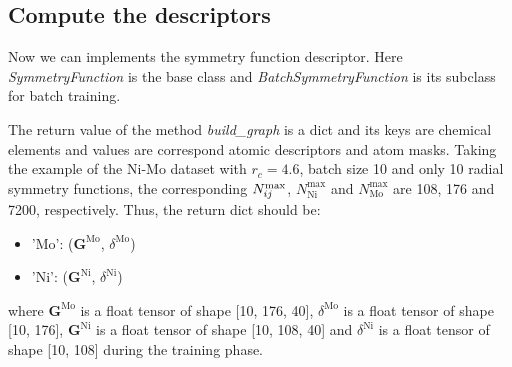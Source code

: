 \documentclass[final,1p,times]{elsarticle}
\begin{document}
% 
%
\subsection{Compute the descriptors}

Now we can implements the symmetry function descriptor. Here 
\textit{SymmetryFunction} is the base class and \textit{BatchSymmetryFunction} 
is its subclass for batch training.

The return value of the method \textit{build\_graph} is a dict and its keys are
chemical elements and values are correspond atomic descriptors and atom masks. 
Taking the example of the Ni-Mo dataset with $r_c = 4.6$, batch size 10 and only
10 radial symmetry functions, the corresponding $N_{ij}^{\mathrm{max}}$, 
$N_{\mathrm{Ni}}^{\mathrm{max}}$ and $N_{\mathrm{Mo}}^{\mathrm{max}}$ are 108, 
176 and 7200, respectively. Thus, the return dict should be:
\begin{itemize}
    \item \textmd{'Mo'}: ($\mathbf{G}^{\mathrm{Mo}}$, $\delta^{\mathrm{Mo}}$)
    \item \textmd{'Ni'}: ($\mathbf{G}^{\mathrm{Ni}}$, $\delta^{\mathrm{Ni}}$)
\end{itemize}
where $\mathbf{G}^{\mathrm{Mo}}$ is a float tensor of shape 
\textmd{[10, 176, 40]}, $\delta^{\mathrm{Mo}}$ is a float tensor of shape  
\textmd{[10, 176]}, $\mathbf{G}^{\mathrm{Ni}}$ is a float tensor of shape 
\textmd{[10, 108, 40]} and $\delta^{\mathrm{Ni}}$ is a float tensor of shape  
\textmd{[10, 108]} during the training phase. 
\end{document}
